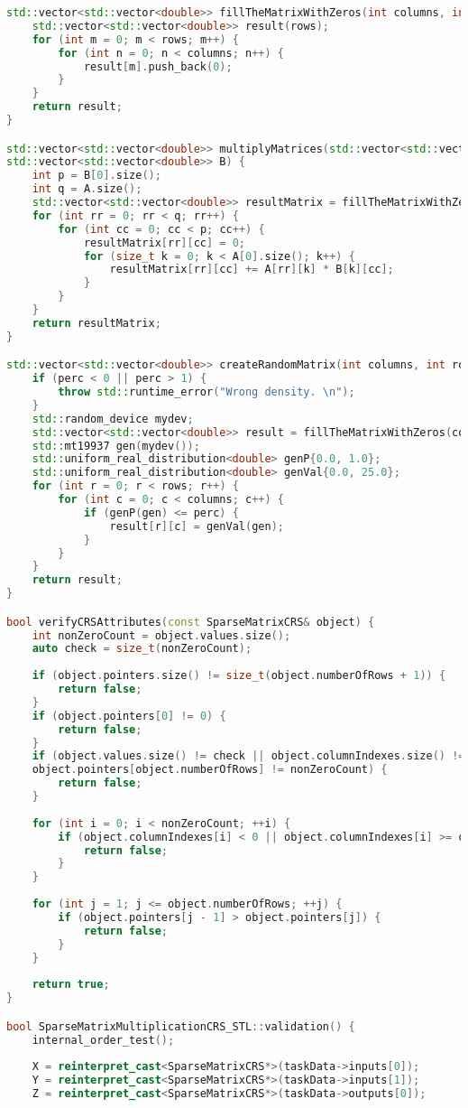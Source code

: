 \documentclass[a4paper, 14pt]{article}
\newcommand{\n}{\par}
\theoremstyle{plain}
\begin{document}
\begin{lstlisting}[language=C++,caption=Файл sparse\_matmult\_crs\_stl.cpp]
std::vector<std::vector<double>> fillTheMatrixWithZeros(int columns, int rows) {
	std::vector<std::vector<double>> result(rows);
	for (int m = 0; m < rows; m++) {
		for (int n = 0; n < columns; n++) {
			result[m].push_back(0);
		}
	}
	return result;
}

std::vector<std::vector<double>> multiplyMatrices(std::vector<std::vector<double>> A,
std::vector<std::vector<double>> B) {
	int p = B[0].size();
	int q = A.size();
	std::vector<std::vector<double>> resultMatrix = fillTheMatrixWithZeros(p, q);
	for (int rr = 0; rr < q; rr++) {
		for (int cc = 0; cc < p; cc++) {
			resultMatrix[rr][cc] = 0;
			for (size_t k = 0; k < A[0].size(); k++) {
				resultMatrix[rr][cc] += A[rr][k] * B[k][cc];
			}
		}
	}
	return resultMatrix;
}

std::vector<std::vector<double>> createRandomMatrix(int columns, int rows, double perc) {
	if (perc < 0 || perc > 1) {
		throw std::runtime_error("Wrong density. \n");
	}
	std::random_device mydev;
	std::vector<std::vector<double>> result = fillTheMatrixWithZeros(columns, rows);
	std::mt19937 gen(mydev());
	std::uniform_real_distribution<double> genP{0.0, 1.0};
	std::uniform_real_distribution<double> genVal{0.0, 25.0};
	for (int r = 0; r < rows; r++) {
		for (int c = 0; c < columns; c++) {
			if (genP(gen) <= perc) {
				result[r][c] = genVal(gen);
			}
		}
	}
	return result;
}

bool verifyCRSAttributes(const SparseMatrixCRS& object) {
	int nonZeroCount = object.values.size();
	auto check = size_t(nonZeroCount);
	
	if (object.pointers.size() != size_t(object.numberOfRows + 1)) {
		return false;
	}
	if (object.pointers[0] != 0) {
		return false;
	}
	if (object.values.size() != check || object.columnIndexes.size() != check ||
	object.pointers[object.numberOfRows] != nonZeroCount) {
		return false;
	}
	
	for (int i = 0; i < nonZeroCount; ++i) {
		if (object.columnIndexes[i] < 0 || object.columnIndexes[i] >= object.numberOfColumns) {
			return false;
		}
	}
	
	for (int j = 1; j <= object.numberOfRows; ++j) {
		if (object.pointers[j - 1] > object.pointers[j]) {
			return false;
		}
	}
	
	return true;
}

bool SparseMatrixMultiplicationCRS_STL::validation() {
	internal_order_test();
	
	X = reinterpret_cast<SparseMatrixCRS*>(taskData->inputs[0]);
	Y = reinterpret_cast<SparseMatrixCRS*>(taskData->inputs[1]);
	Z = reinterpret_cast<SparseMatrixCRS*>(taskData->outputs[0]);
	

\end{lstlisting}
\end{document}
